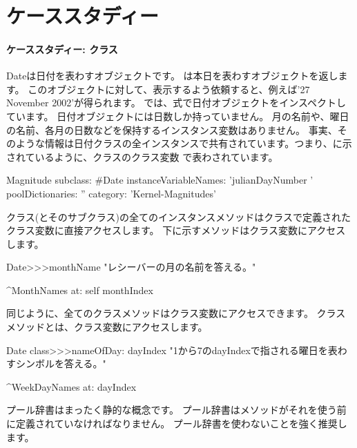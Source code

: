 \documentclass[a4paper,10pt,twoside]{book}
\begin{document}
	\renewcommand{\nnbb}[2]{} %
	\sloppy
\fi


\chapter{ケーススタディー}

\subsubsection{ケーススタディー: クラス}
Dateは日付を表わすオブジェクトです。
は本日を表わすオブジェクトを返します。
このオブジェクトに対して、表示するよう依頼すると、例えば'27 November 2002'が得られます。%
では、式で日付オブジェクトをインスペクトしています。
日付オブジェクトには日数しか持っていません。
月の名前や、曜日の名前、各月の日数などを保持するインスタンス変数はありません。
事実、そのような情報は日付クラスの全インスタンスで共有されています。つまり、に示されているように、クラスのクラス変数 %
で表わされています。

\begin{classdef}{}
Magnitude subclass: \#Date
   instanceVariableNames: 'julianDayNumber '
   poolDictionaries: ''
   category: 'Kernel-Magnitudes'
\end{classdef}


クラス(とそのサブクラス)の全てのインスタンスメソッドはクラスで定義されたクラス変数に直接アクセスします。
下に示すメソッドはクラス変数にアクセスします。

\begin{method}{}
Date>>>monthName
   "レシーバーの月の名前を答える。"

   ^MonthNames at: self monthIndex
\end{method}

同じように、全てのクラスメソッドはクラス変数にアクセスできます。
クラスメソッドとは、クラス変数にアクセスします。

\begin{method}{}
Date class>>>nameOfDay: dayIndex 
   "1から7のdayIndexで指される曜日を表わすシンボルを答える。"

   ^WeekDayNames at: dayIndex
\end{method}


プール辞書はまったく静的な概念です。 %
プール辞書はメソッドがそれを使う前に定義されていなければなりません。%
プール辞書を使わないことを強く推奨します。%

\ifx\wholebook\relax\else
\end{document}
